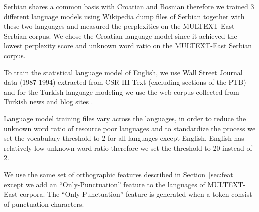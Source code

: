 Serbian shares a common basis with Croatian and Bosnian therefore we
trained 3 different language models using Wikipedia dump files of
Serbian together with these two languages and measured the
perplexities on the MULTEXT-East Serbian corpus.  We chose the
Croatian language model since it achieved the lowest perplexity score
and unknown word ratio on the MULTEXT-East Serbian corpus.

To train the statistical language model of English, we use Wall Street
Journal data (1987-1994) extracted from CSR-III Text \cite{csr3text}
(excluding sections of the PTB) and for the Turkish language modeling
we use the web corpus collected from Turkish news and blog sites
\cite{sak2008turkish}.

Language model training files vary across the languages, in order to
reduce the unknown word ratio of resource poor languages and to
standardize the process we set the vocabulary threshold to 2 for all
languages except English.  English has relatively low unknown word
ratio therefore we set the threshold to 20 instead of 2.

We use the same set of orthographic features described in
Section~\ref{sec:feat} except we add an ``Only-Punctuation'' feature
to the languages of MULTEXT-East corpora.  The ``Only-Punctuation''
feature is generated when a token consist of punctuation characters.

